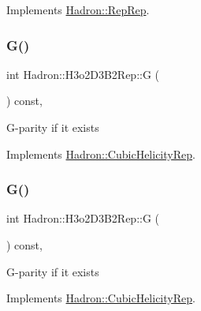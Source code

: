 Implements \mbox{\hyperlink{structHadron_1_1RepRep_a92c8802e5ed7afd7da43ccfd5b7cd92b}{Hadron\+::\+Rep\+Rep}}.

\mbox{\label{structHadron_1_1H3o2D3B2Rep_acae6192425a1ab69943fdad0b8192817}} 
\subsubsection{\texorpdfstring{G()}{G()}\hspace{0.1cm}{\footnotesize\ttfamily [1/3]}}
{\footnotesize\ttfamily int Hadron\+::\+H3o2\+D3\+B2\+Rep\+::G (\begin{DoxyParamCaption}{ }\end{DoxyParamCaption}) const\hspace{0.3cm}{\ttfamily [inline]}, {\ttfamily [virtual]}}

G-\/parity if it exists 

Implements \mbox{\hyperlink{structHadron_1_1CubicHelicityRep_a50689f42be1e6170aa8cf6ad0597018b}{Hadron\+::\+Cubic\+Helicity\+Rep}}.

\mbox{\label{structHadron_1_1H3o2D3B2Rep_acae6192425a1ab69943fdad0b8192817}} 
\subsubsection{\texorpdfstring{G()}{G()}\hspace{0.1cm}{\footnotesize\ttfamily [2/3]}}
{\footnotesize\ttfamily int Hadron\+::\+H3o2\+D3\+B2\+Rep\+::G (\begin{DoxyParamCaption}{ }\end{DoxyParamCaption}) const\hspace{0.3cm}{\ttfamily [inline]}, {\ttfamily [virtual]}}

G-\/parity if it exists 

Implements \mbox{\hyperlink{structHadron_1_1CubicHelicityRep_a50689f42be1e6170aa8cf6ad0597018b}{Hadron\+::\+Cubic\+Helicity\+Rep}}.

\mbox{\label{structHadron_1_1H3o2D3B2Rep_acae6192425a1ab69943fdad0b8192817}} 
